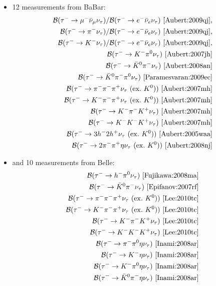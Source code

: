 \documentclass[fleqn,twoside]{article}
\begin{document}
\begin{itemize}
\item 12 measurements from BaBar:
\begin{eqnarray*}
{{\cal{B}}(\tau^- \to \mu^- \bar{\nu}_\mu \nu_\tau)}/{{\cal{B}}(\tau^- \to e^- \bar{\nu}_e \nu_\tau)}~\cite{Aubert:2009qj},\\
{{\cal{B}}(\tau^- \to \pi^- \nu_\tau)}/{{\cal{B}}(\tau^- \to e^- \bar{\nu}_e \nu_\tau)}~\cite{Aubert:2009qj},\\
{{\cal{B}}(\tau^- \to  K^-  \nu_\tau)}/{{\cal{B}}(\tau^- \to e^- \bar{\nu}_e \nu_\tau)}~\cite{Aubert:2009qj},\\
{\cal{B}}(\tau^- \to K^- \pi^0 \nu_\tau)~\cite{Aubert:2007jh}\\
{\cal{B}}(\tau^- \to \bar{K}^0 \pi^- \nu_\tau)~\cite{Aubert:2008an}\\
{\cal{B}}(\tau^- \to \bar{K}^0 \pi^- \pi^0 \nu_\tau)~\cite{Paramesvaran:2009ec}\\
{\cal{B}}(\tau^- \to \pi^- \pi^- \pi^+ \nu_\tau ~(\mathrm{ex.~}K^0))~\cite{Aubert:2007mh}\\
{\cal{B}}(\tau^- \to  K^-  \pi^- \pi^+ \nu_\tau ~(\mathrm{ex.~}K^0))~\cite{Aubert:2007mh}\\
{\cal{B}}(\tau^- \to  K^-  \pi^-  K^+ \nu_\tau)~\cite{Aubert:2007mh}\\
{\cal{B}}(\tau^- \to  K^-   K^-   K^+ \nu_\tau)~\cite{Aubert:2007mh}\\
{\cal{B}}(\tau^- \to  3h^- 2h^+ \nu_\tau ~(\mathrm{ex.~}K^0))~\cite{Aubert:2005waa}\\
{\cal{B}}(\tau^- \to  2\pi^- \pi^+ \eta \nu_\tau ~(\mathrm{ex.~}K^0))~\cite{Aubert:2008nj}
\end{eqnarray*}
\item and 10 measurements from Belle:
\begin{eqnarray*}
{\cal{B}}(\tau^- \to h^- \pi^0 \nu_\tau)~\cite{Fujikawa:2008ma}\\
{\cal{B}}(\tau^- \to \bar{K}^0 \pi^- \nu_\tau)~\cite{Epifanov:2007rf}\\
{\cal{B}}(\tau^- \to \pi^- \pi^- \pi^+ \nu_\tau ~(\mathrm{ex.~}K^0))~\cite{Lee:2010tc}\\
{\cal{B}}(\tau^- \to  K^-  \pi^- \pi^+ \nu_\tau ~(\mathrm{ex.~}K^0))~\cite{Lee:2010tc}\\
{\cal{B}}(\tau^- \to  K^-  \pi^-  K^+ \nu_\tau)~\cite{Lee:2010tc}\\
{\cal{B}}(\tau^- \to  K^-   K^-   K^+ \nu_\tau)~\cite{Lee:2010tc}\\
{\cal{B}}(\tau^- \to  \pi^- \pi^0 \eta \nu_\tau)~\cite{Inami:2008ar}\\
{\cal{B}}(\tau^- \to  K^- \eta \nu_\tau)~\cite{Inami:2008ar}\\
{\cal{B}}(\tau^- \to  K^- \pi^0 \eta \nu_\tau)~\cite{Inami:2008ar}\\
{\cal{B}}(\tau^- \to  \bar{K}^0 \pi^- \eta \nu_\tau)~\cite{Inami:2008ar}
\end{eqnarray*}
\end{itemize}
\end{document}
